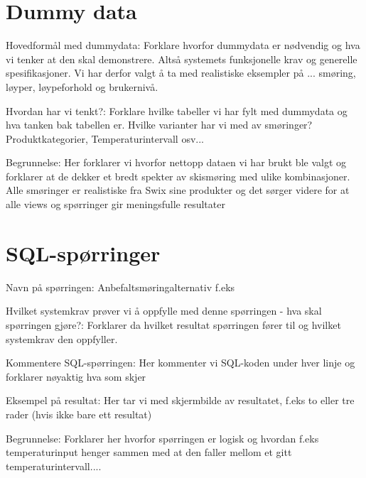 \documentclass[12pt, a4paper]{article}
\begin{document}
\section{Dummy data}

Hovedformål med dummydata:
Forklare hvorfor dummydata er nødvendig og hva vi tenker at den skal demonstrere. Altså systemets funksjonelle krav og generelle spesifikasjoner. Vi har derfor valgt å ta med realistiske eksempler på ... smøring, løyper, løypeforhold og brukernivå. 

Hvordan har vi tenkt?:
Forklare hvilke tabeller vi har fylt med dummydata og hva tanken bak tabellen er. Hvilke varianter har vi med av smøringer? Produktkategorier, Temperaturintervall osv...

Begrunnelse:
Her forklarer vi hvorfor nettopp dataen vi har brukt ble valgt og forklarer at de dekker et bredt spekter av skismøring med ulike kombinasjoner. Alle smøringer er realistiske fra Swix sine produkter og det sørger videre for at alle views og spørringer gir meningsfulle resultater

\section{SQL-spørringer}

Navn på spørringen: Anbefaltsmøringalternativ f.eks

Hvilket systemkrav prøver vi å oppfylle med denne spørringen - hva skal spørringen gjøre?: Forklarer da hvilket resultat spørringen fører til og hvilket systemkrav den oppfyller.

Kommentere SQL-spørringen: Her kommenter vi SQL-koden under hver linje og forklarer nøyaktig hva som skjer

Eksempel på resultat: Her tar vi med skjermbilde av resultatet, f.eks to eller tre rader (hvis ikke bare ett resultat)

Begrunnelse: Forklarer her hvorfor spørringen er logisk og hvordan f.eks temperaturinput henger sammen med at den faller mellom et gitt temperaturintervall....

\end{document}
